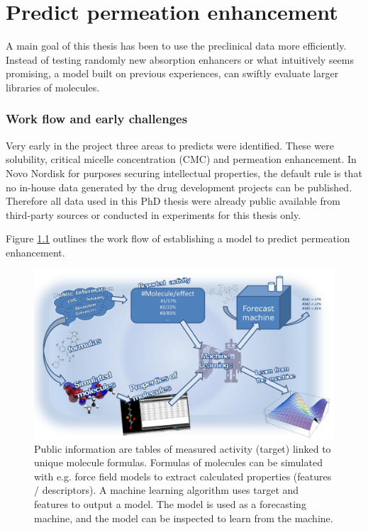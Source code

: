 \chapter{Predict permeation enhancement}

A main goal of this thesis has been to use the preclinical data more efficiently. Instead of testing randomly new absorption enhancers or what intuitively seems promising, a model built on previous experiences, can swiftly evaluate larger libraries of molecules.

\subsection{Work flow and early challenges}
\label{predPerm:workflow}

Very early in the project three areas to predicts were identified. These were solubility, critical micelle concentration (CMC) and permeation enhancement. In Novo Nordisk for purposes securing intellectual properties, the default rule is that no in-house data generated by the drug development projects can be published. Therefore all data used in this PhD thesis were already public available from third-party sources or conducted in experiments for this thesis only.

Figure \ref{predict_workflow} outlines the work flow of establishing a model to predict permeation enhancement.

\begin{figure}[!htbp]

\includegraphics[width=\textwidth, height=\textheight, keepaspectratio]{graphics/predictPotencySummary.pdf}
\caption{Public information are tables of measured activity (target) linked to unique molecule formulas. Formulas of molecules can be simulated with e.g. force field models to extract calculated properties (features / descriptors). A machine learning algorithm uses target and features to output a model. The model is used as a forecasting machine, and the model can be inspected to learn from the machine.}
\label{predict_workflow}
\end{figure}

